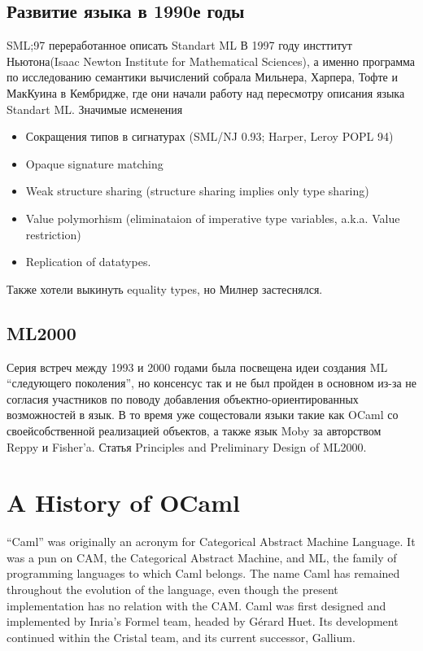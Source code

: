 \documentclass[14pt]{matmex-diploma-custom}
\begin{document}
\begin{itemize}
\begin{itemize}
\subsection{Развитие языка в 1990е годы}
SML;97 переработанное описать Standart ML
В 1997 году инсттитут Ньютона(Isaac Newton Institute for Mathematical Sciences), а именно программа по исследованию семантики вычислений собрала Мильнера, Харпера, Тофте и МакКуина в Кембридже, где они начали работу над пересмотру описания языка Standart ML. Значимые исменения 

\begin{itemize}
 \item Сокращения типов в сигнатурах (SML/NJ 0.93; Harper, Leroy POPL 94)
\item Opaque signature matching
\item Weak structure sharing (structure sharing implies only type sharing) 
\item Value polymorhism (eliminataion of imperative type variables, a.k.a. Value restriction)
\item Replication of datatypes.
\end{itemize}
Также хотели выкинуть equality types, но Милнер застеснялся.

\subsection{ML2000}
Серия встреч между 1993 и 2000 годами была посвещена идеи создания ML “следующего поколения”,  но консенсус так и не был пройден в основном из-за не согласия участников по поводу добавления объектно-ориентированных возможностей в язык.
В то время уже сощестовали языки такие как OCaml со своейсобственной реализацией объектов, а также язык Moby за авторством Reppy и Fisher’a. 
Статья Principles and Preliminary Design of ML2000. 


\section{A History of OCaml}
“Caml” was originally an acronym for Categorical Abstract Machine Language. It was a pun on CAM, the Categorical Abstract Machine, and ML, the family of programming languages to which Caml belongs. The name Caml has remained throughout the evolution of the language, even though the present implementation has no relation with the CAM.
Caml was first designed and implemented by Inria's Formel team, headed by Gérard Huet. Its development continued within the Cristal team, and its current successor, Gallium.

\end{itemize}
\end{itemize}
\end{document}
